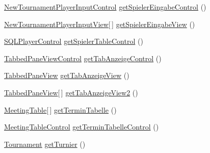 \begin{DoxyCompactItemize}
\item 
\hyperlink{classde_1_1turnierverwaltung_1_1control_1_1_new_tournament_player_input_control}{New\+Tournament\+Player\+Input\+Control} \hyperlink{classde_1_1turnierverwaltung_1_1control_1_1_main_control_a1e9d6ec38e25d21348786b40482b8639}{get\+Spieler\+Eingabe\+Control} ()
\item 
\hyperlink{classde_1_1turnierverwaltung_1_1view_1_1_new_tournament_player_input_view}{New\+Tournament\+Player\+Input\+View}\mbox{[}$\,$\mbox{]} \hyperlink{classde_1_1turnierverwaltung_1_1control_1_1_main_control_ab56b4618cf788f0be697b43d425f43c6}{get\+Spieler\+Eingabe\+View} ()
\item 
\hyperlink{classde_1_1turnierverwaltung_1_1control_1_1_s_q_l_player_control}{S\+Q\+L\+Player\+Control} \hyperlink{classde_1_1turnierverwaltung_1_1control_1_1_main_control_a26713355b40c4d1f63f00f040d1edfb7}{get\+Spieler\+Table\+Control} ()
\item 
\hyperlink{classde_1_1turnierverwaltung_1_1control_1_1_tabbed_pane_view_control}{Tabbed\+Pane\+View\+Control} \hyperlink{classde_1_1turnierverwaltung_1_1control_1_1_main_control_a3307e5d165e4db2e0beaf81841f5972d}{get\+Tab\+Anzeige\+Control} ()
\item 
\hyperlink{classde_1_1turnierverwaltung_1_1view_1_1_tabbed_pane_view}{Tabbed\+Pane\+View} \hyperlink{classde_1_1turnierverwaltung_1_1control_1_1_main_control_a8f2c9c960a3d5de81b570a2389b14ab2}{get\+Tab\+Anzeige\+View} ()
\item 
\hyperlink{classde_1_1turnierverwaltung_1_1view_1_1_tabbed_pane_view}{Tabbed\+Pane\+View}\mbox{[}$\,$\mbox{]} \hyperlink{classde_1_1turnierverwaltung_1_1control_1_1_main_control_aed25e0e1b2f32bf872874a69217c21d1}{get\+Tab\+Anzeige\+View2} ()
\item 
\hyperlink{classde_1_1turnierverwaltung_1_1model_1_1_meeting_table}{Meeting\+Table}\mbox{[}$\,$\mbox{]} \hyperlink{classde_1_1turnierverwaltung_1_1control_1_1_main_control_ac39e004121dcb755f65ff63019b18260}{get\+Termin\+Tabelle} ()
\item 
\hyperlink{classde_1_1turnierverwaltung_1_1control_1_1_meeting_table_control}{Meeting\+Table\+Control} \hyperlink{classde_1_1turnierverwaltung_1_1control_1_1_main_control_a3f122b4be39faae897c09798dcc39f7e}{get\+Termin\+Tabelle\+Control} ()
\item 
\hyperlink{classde_1_1turnierverwaltung_1_1model_1_1_tournament}{Tournament} \hyperlink{classde_1_1turnierverwaltung_1_1control_1_1_main_control_aba12231f92c78d9ab32338b6c1c67cf5}{get\+Turnier} ()
\item 

\end{DoxyCompactItemize}
